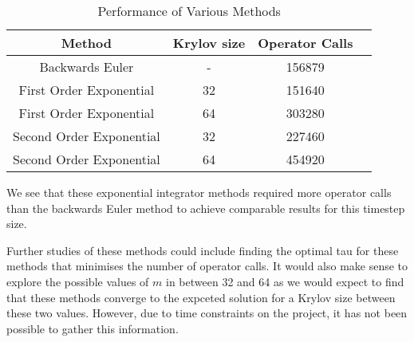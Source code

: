 \begin{table}[H]
    \centering
    \begin{tabular}{| c | c | c | c |}
    \hline
    Method & Krylov size & Operator Calls\\
    \hline
    Backwards Euler & - & 156879 \\
    First Order Exponential & 32 & 151640 \\
    First Order Exponential & 64 & 303280 \\
    Second Order Exponential & 32 & 227460 \\
    Second Order Exponential & 64 & 454920 \\
    \hline
    \end{tabular}
    \caption{Performance of Various Methods}
    \label{tab:reduced_data}
\end{table}

We see that these exponential integrator methods required more operator calls than the backwards Euler method to achieve comparable results for this timestep size.


Further studies of these methods could include finding the optimal tau for these methods that minimises the number of operator calls.
It would also make sense to explore the possible values of $m$ in between 32 and 64 as we would expect to find that these methods converge to the expceted solution for a Krylov size between these two values.
However, due to time constraints on the project, it has not been possible to gather this information.

